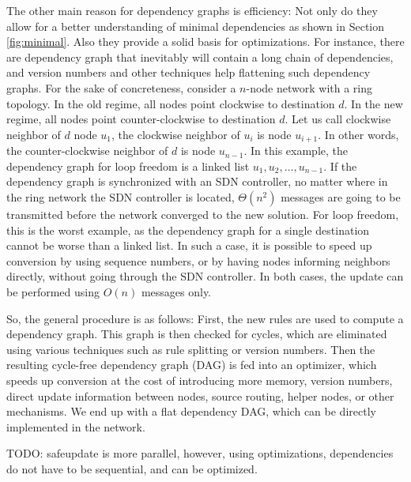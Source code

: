 The other main reason for dependency graphs is efficiency: Not only do they allow for a better understanding of minimal dependencies as shown in Section \ref{fig:minimal}. Also they provide a solid basis for optimizations. For instance, there are dependency graph that inevitably will contain a long chain of dependencies, and version numbers and other techniques help flattening such dependency graphs. For the sake of concreteness, consider a $n$-node network with a ring topology. In the old regime, all nodes point clockwise to destination $d$. In the new regime, all nodes point counter-clockwise to destination $d$. Let us call clockwise neighbor of $d$ node $u_1$, the clockwise neighbor of $u_i$ is node $u_{i+1}$. In other words, the counter-clockwise neighbor of $d$ is node $u_{n-1}$. In this example, the dependency graph for loop freedom is a linked list $u_1,u_2,\ldots,u_{n-1}$. If the dependency graph is synchronized with an SDN controller, no matter where in the ring network the SDN controller is located, $\Theta(n^2)$ messages are going to be transmitted before the network converged to the new solution. For loop freedom, this is the worst example, as the dependency graph for a single destination cannot be worse than a linked list. In such a case, it is possible to speed up conversion by using sequence numbers, or by having nodes informing neighbors directly, without going through the SDN controller. In both cases, the update can be performed using $O(n)$ messages only.

So, the general procedure is as follows: First, the new rules are used to compute a dependency graph. This graph is then checked for cycles, which are eliminated using various techniques such as rule splitting or version numbers. Then the resulting cycle-free dependency graph (DAG) is fed into an optimizer, which speeds up conversion at the cost of introducing more memory, version numbers, direct update information between nodes, source routing, helper nodes, or other mechanisms. We end up with a flat dependency DAG, which can be directly implemented in the network.

TODO: safeupdate is more parallel, however, using optimizations, dependencies do not have to be sequential, and can be optimized.


